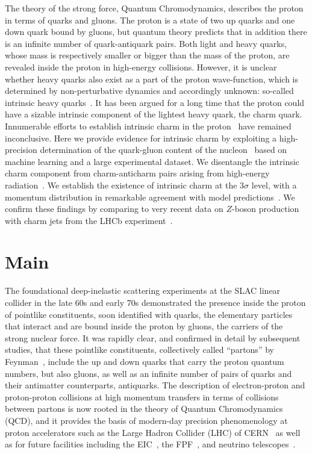 
The theory of the strong  force, Quantum Chromodynamics, describes the proton
in terms of quarks and gluons. The proton is a state of two up quarks and one
down quark bound by gluons, but quantum theory predicts that in addition there
is an infinite number of quark-antiquark pairs.
%
Both light and heavy quarks, whose  mass is respectively smaller or bigger than
the mass of the proton, are  revealed inside the proton in high-energy
collisions.
%
However, it is unclear whether heavy quarks also exist as a part of the proton
wave-function, which is determined by non-perturbative dynamics and
accordingly unknown: so-called intrinsic heavy quarks~\cite{Brodsky:1980pb}.
It has been
argued for a long time that the proton could have a sizable intrinsic component
of the lightest  heavy quark, the charm quark.
Innumerable efforts to establish intrinsic charm in the
proton~\cite{Brodsky:2015fna} have remained inconclusive.
%
Here we provide evidence for intrinsic charm by exploiting a high-precision
determination of the quark-gluon content of the nucleon~\cite{Ball:2021leu}
based on machine learning and a large experimental dataset.
%
We disentangle the intrinsic charm component from charm-anticharm pairs arising
from high-energy radiation~\cite{Ball:2015tna}.
We establish the existence of intrinsic charm at the  $3\sigma$ level, with a
momentum distribution in remarkable agreement with model
predictions~\cite{Brodsky:1980pb,Hobbs:2013bia}.
%
We confirm these findings by comparing to very recent data on $Z$-boson
production with charm jets  from the LHCb experiment~\cite{LHCb:2021stx}. 

\section*{Main}

The foundational deep-inelastic scattering experiments at the SLAC linear collider
in the late 60s and early 70s demonstrated the presence inside the
proton of pointlike  constituents, soon identified with quarks, the
elementary particles that interact and are bound inside the proton by
gluons, the carriers of the strong  nuclear force.
%
It was rapidly clear, and confirmed in detail by subsequent studies,
that these pointlike constituents, collectively called ``partons'' by
Feynman~\cite{Feynman:1969wa}, include the up and down quarks that
carry the proton quantum numbers, but also gluons, as well
as an infinite number of pairs of quarks and their
antimatter counterparts, antiquarks.
%
The description of electron-proton and proton-proton collisions at high
momentum transfers in terms of collisions between partons is now
rooted in the theory of Quantum  Chromodynamics (QCD), and it provides
the basis
of modern-day precision phenomenology at proton accelerators such as
the Large Hadron Collider
(LHC) of CERN~\cite{Gao:2017yyd} as well
as for future facilities including the
EIC~\cite{AbdulKhalek:2021gbh},
the FPF~\cite{Feng:2022inv},
and  
neutrino telescopes~\cite{IceCube-Gen2:2020qha}.

